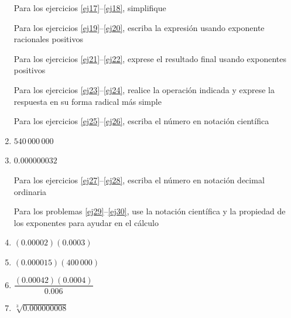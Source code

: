 \documentclass[letterpaper,twoside]{article}
\begin{document}
\begin{multicols}{2}
\begin{enumerate}
Para los ejercicios \ref{ej17}--\ref{ej18}, simplifique
Para los ejercicios \ref{ej19}--\ref{ej20}, escriba la expresión usando exponente racionales positivos
Para los ejercicios \ref{ej21}--\ref{ej22}, exprese el resultado final usando exponentes positivos
Para los ejercicios \ref{ej23}--\ref{ej24}, realice la operación indicada y exprese la respuesta en su forma radical más simple
Para los ejercicios \ref{ej25}--\ref{ej26}, escriba el número en notación científica
\item \label{ej25} $540\,000\,000$
\item \label{ej26} $0.000000032$

Para los ejercicios \ref{ej27}--\ref{ej28}, escriba el número en notación decimal ordinaria
Para los problemas \ref{ej29}--\ref{ej30}, use la notación científica y la propiedad de los exponentes para ayudar en el cálculo
\item \label{ej29} $(0.00002)(0.0003)$
\item $(0.000015)(400\,000)$
\item $\dfrac{(0.00042)(0.0004)}{0.006}$
\item $\sqrt[3]{0.000000008}$ \label{ej30}

\end{enumerate}
\end{multicols}
\end{document}
